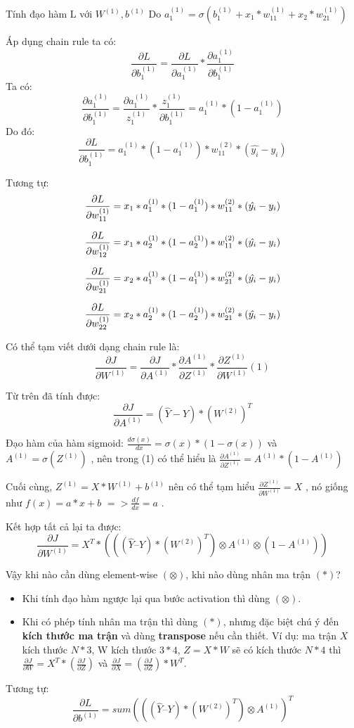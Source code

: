 Tính đạo hàm L với $W^{(1)}, b^{(1)}$
Do $ a_1^{(1)} = \sigma(b_1^{(1)} + x_1*w_{11}^{(1)} + x_2*w_{21}^{(1)})$ 

Áp dụng chain rule ta có: $$ \frac{\partial L}{\partial b_1^{(1)}} = \frac{\partial L}{\partial a_1^{(1)}} * \frac{\partial a_1^{(1)}}{\partial b_1^{(1)} }$$
Ta có:
$$\frac{\partial a_1^{(1)}}{\partial b_1^{(1)}} = \frac{\partial a_1^{(1)}}{z_1^{(1)}} * \frac{z_1^{(1)}}{\partial b_1^{(1)}} = a_1^{(1)} * (1 - a_1^{(1)})$$
Do đó:
$$\frac{\partial L}{\partial b_1^{(1)}} = a_1 ^ {(1)} * (1 - a_1^{(1)}) * w_{11}^{(2)} * (\hat{y_i} - y_i)$$

Tương tự:
$$\frac{\partial L}{\partial w_{11}^{(1)}} = x_1 * a_1 ^ {(1)} * (1 - a_1^{(1)}) * w_{11}^{(2)} *  (\hat{y_i} - y_i)  \newline$$

$$\frac{\partial L}{\partial w_{12}^{(1)}} = x_1 * a_2 ^ {(1)} * (1 - a_2^{(1)}) * w_{11}^{(2)} *  (\hat{y_i} - y_i)  \newline$$

$$\frac{\partial L}{\partial w_{21}^{(1)}} = x_2 * a_1 ^ {(1)} * (1 - a_1^{(1)}) * w_{21}^{(2)} *  (\hat{y_i} - y_i)  \newline $$

$$\frac{\partial L}{\partial w_{22}^{(1)}} = x_2 * a_2^ {(1)} * (1 - a_2^{(1)}) * w_{21}^{(2)} *  (\hat{y_i} - y_i)  \newline$$

Có thể tạm viết dưới dạng chain rule là: $$\frac{\partial J}{\partial W^{(1)}} = \frac{\partial J}{\partial A^{(1)}} * \frac{\partial A^{(1)}}{\partial Z^{(1)}}* \frac{\partial Z^{(1)}}{\partial W^{(1)}} (1) $$

Từ trên đã tính được: $$\frac{\partial J}{\partial A^{(1)}} = (\hat{Y} - Y) * (W^{(2)})^T$$

Đạo hàm của hàm sigmoid: $\frac{d\sigma(x)}{dx} = \sigma(x) * (1 - \sigma(x))$ và $A^{(1)} = \sigma(Z^{(1)})$ , nên trong (1) có thể hiểu là $\frac{\partial A^{(1)}}{\partial Z^{(1)}} = A^{(1)}* (1 - A^{(1)})$

Cuối cùng, $Z^{(1)} = X * W^{(1)} + b^{(1)}$ nên có thể tạm hiểu $\frac{\partial Z^{(1)}}{\partial W^{(1)}} = X$ , nó giống như $f(x)= a*x +b$ $ => \frac{df}{dx} = a$ .

Kết hợp tất cả lại ta được:
$$\frac{\partial J}{\partial W^{(1)}} = X^T * (((\hat{Y} – Y) * (W^{(2)})^T)\otimes A^{(1)}\otimes (1-A^{(1)}) ) $$

Vậy khi nào cần dùng element-wise $(\otimes)$, khi nào dùng nhân ma trận $(*)$?
\begin{itemize}
\item Khi tính đạo hàm ngược lại qua bước activation thì dùng $(\otimes)$.
\item Khi có phép tính nhân ma trận thì dùng $(*)$, nhưng đặc biệt chú ý đến \textbf{kích thước ma trận} và dùng \textbf{transpose} nếu cần thiết. Ví dụ: ma trận $X$ kích thước $N*3$, W kích thước $3*4$, $Z = X * W$ sẽ có kích thước $N*4$ thì $\frac{\partial J}{\partial W} = X^T * (\frac{\partial J}{\partial Z})$ và $\frac{\partial J}{\partial X} = (\frac{\partial J}{\partial Z}) * W^T$.
\end{itemize}
Tương tự: $$\frac{\partial L}{\partial b^{(1)}} = sum(((\hat{Y} – Y) * (W^{(2)})^T)\otimes A^{(1)})^T$$

